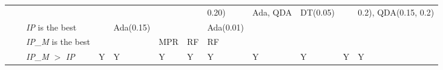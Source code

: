 \begin{sidewaystable}[htbp]
{\begin{tabular}{l|l|l|l|l|l|l|l|l|l|l|l}
                             &&                                 &               &               &                &               & {\scriptsize 0.20)}   & {\scriptsize Ada, QDA }         & {\scriptsize DT(0.05) }      &                & {\scriptsize  0.2), QDA(0.15, 0.2)}            \\\cline{3-12}
                             && \textit{IP} is the best                      &               & {\scriptsize Ada(0.15)}     &                &               & {\scriptsize Ada(0.01)}     &                  &                &                &                           \\\cline{3-12}
                             && \textit{IP\_M} is the best                   &               &               & {\scriptsize MPR}            & {\scriptsize RF}           & {\scriptsize RF }          &                  &                &                &                           \\\cline{3-12}
                             && \textit{IP\_M} $>$ \textit{IP}               & Y             & Y             & Y              & Y             & Y             & Y                & Y              & Y              & Y\\    
\hline
\hline
\hline
\end{tabular}
  }
\end{sidewaystable}
